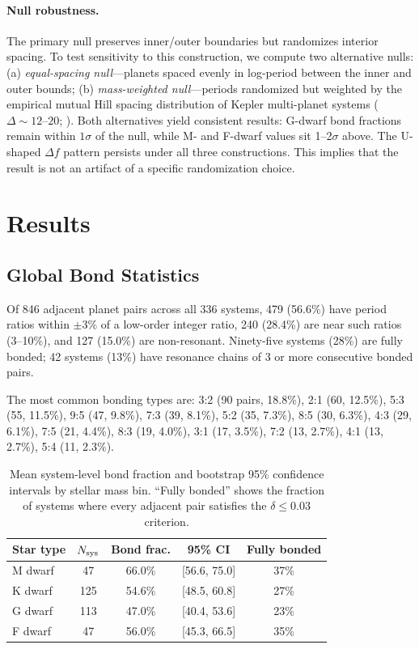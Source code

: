 \documentclass[twocolumn,usenatbib]{mnras}
\begin{document}
\paragraph{Null robustness.}
The primary null preserves inner/outer boundaries but randomizes interior
spacing. To test sensitivity to this construction, we compute two alternative
nulls: (a) \textit{equal-spacing null}---planets spaced evenly in log-period
between the inner and outer bounds; (b) \textit{mass-weighted null}---periods
randomized but weighted by the empirical mutual Hill spacing distribution of
Kepler multi-planet systems ($\Delta \sim 12$--$20$;
\citet{puwu2015}). Both alternatives yield consistent results: G-dwarf bond
fractions remain within $1\sigma$ of the null, while M- and F-dwarf values sit
1--2$\sigma$ above. The U-shaped $\Delta f$ pattern persists under all three
constructions. This implies that the result is not an artifact of a specific
randomization choice.

\section{Results}
\label{sec:results}

\subsection{Global Bond Statistics}

Of 846 adjacent planet pairs across all 336 systems, 479 (56.6\%) have period
ratios within $\pm 3\%$ of a low-order integer ratio, 240 (28.4\%) are near
such ratios (3--10\%), and 127 (15.0\%) are non-resonant. Ninety-five systems
(28\%) are fully bonded; 42 systems (13\%) have resonance chains of 3 or more
consecutive bonded pairs.

The most common bonding types are: 3:2 (90 pairs, 18.8\%), 2:1 (60, 12.5\%),
5:3 (55, 11.5\%), 9:5 (47, 9.8\%), 7:3 (39, 8.1\%), 5:2 (35, 7.3\%),
8:5 (30, 6.3\%), 4:3 (29, 6.1\%), 7:5 (21, 4.4\%), 8:3 (19, 4.0\%),
3:1 (17, 3.5\%), 7:2 (13, 2.7\%), 4:1 (13, 2.7\%), 5:4 (11, 2.3\%).

\begin{table}
\centering
\caption{Mean system-level bond fraction and bootstrap 95\% confidence
intervals by stellar mass bin. ``Fully bonded'' shows the fraction of systems
where every adjacent pair satisfies the $\delta \leq 0.03$ criterion.}
\label{tab:ushape}
\begin{tabular}{lcccc}
\hline
Star type & $N_{\rm sys}$ & Bond frac. & 95\% CI & Fully bonded\\
\hline
M dwarf & 47 & 66.0\% & [56.6, 75.0] & 37\%\\
K dwarf & 125 & 54.6\% & [48.5, 60.8] & 27\%\\
G dwarf & 113 & 47.0\% & [40.4, 53.6] & 23\%\\
F dwarf & 47 & 56.0\% & [45.3, 66.5] & 35\%\\
\hline
\end{tabular}
\end{table}
\end{document}

